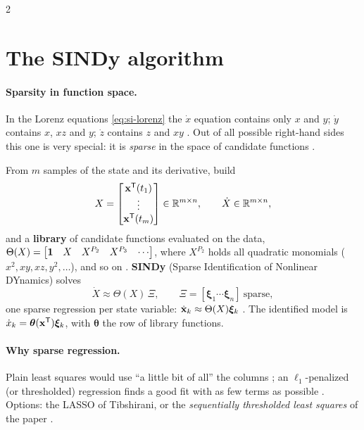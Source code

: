 \begin{paracol}{2}
\section{The SINDy algorithm}\label{sec:si-algorithm}

\paragraph{Sparsity in function space.} In the Lorenz equations \eqref{eq:si-lorenz} the $\dot x$ equation
contains only $x$ and $y$; $\dot y$ contains $x$, $xz$ and $y$; $\dot z$ contains $z$ and $xy$
. Out of all possible right-hand sides this one is very special: it is
\emph{sparse} in the space of candidate functions .

\begin{definition}\label{def:sindy}
From $m$ samples of the state and its derivative, build
\[
  X=\begin{bmatrix}\mathbf{x}^{\mathsf T}(t_1)\\\vdots\\\mathbf{x}^{\mathsf T}(t_m)\end{bmatrix}\in\mathbb{R}^{m\times n},\qquad
  \dot X\in\mathbb{R}^{m\times n},
\]
and a \textbf{library} of candidate functions evaluated on the data,
$\Theta(X)=\begin{bmatrix}\mathbf{1} & X & X^{P_2} & X^{P_3}&\cdots\end{bmatrix}$, where $X^{P_2}$ holds all
quadratic monomials ($x^2,xy,xz,y^2,\dots$), and so on . \textbf{SINDy} (Sparse
Identification of Nonlinear DYnamics) solves
\begin{equation}\label{eq:sindy}
  \dot X\approx\Theta(X)\,\Xi,\qquad \Xi=[\boldsymbol\xi_1\cdots\boldsymbol\xi_n]\ \text{sparse},
\end{equation}
one sparse regression per state variable: $\dot{\mathbf{x}}_k\approx\Theta(X)\boldsymbol\xi_k$ .
The identified model is $\dot x_k=\boldsymbol\theta(\mathbf{x}^{\mathsf T})\boldsymbol\xi_k$, with
$\boldsymbol\theta$ the row of library functions.
\end{definition}

\paragraph{Why sparse regression.} Plain least squares would use ``a little bit of all'' the columns
; an $\ell_1$-penalized (or thresholded) regression finds a good fit with as few terms as
possible . Options: the LASSO of Tibshirani, or the \emph{sequentially thresholded least
squares} of the paper .


\end{paracol}
